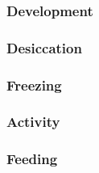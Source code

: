 \documentclass[a4paper, 11pt]{article}
\begin{document}
\subsubsection{Development}

\subsubsection{Desiccation}

\subsubsection{Freezing}

\subsubsection{Activity}

\subsubsection{Feeding}
\end{document}
